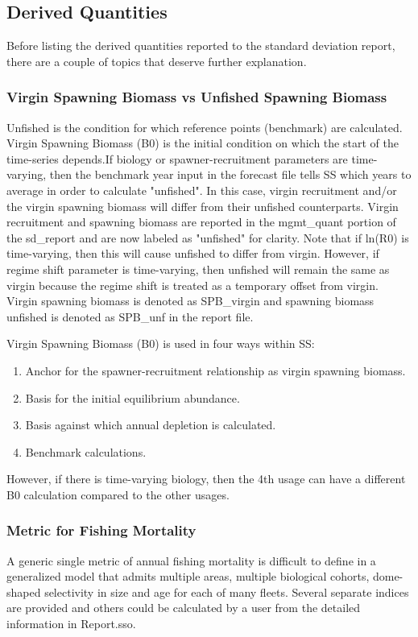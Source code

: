 \subsection{Derived Quantities}
Before listing the derived quantities reported to the standard deviation report, there are a couple of topics that deserve further explanation.

\hypertarget{VirginUnfished}{}
\subsubsection{Virgin Spawning Biomass vs Unfished Spawning Biomass}
Unfished is the condition for which reference points (benchmark) are calculated.  Virgin Spawning Biomass (B0) is the initial condition on which the start of the time-series depends.If biology or spawner-recruitment parameters are time-varying, then the benchmark year input in the forecast file tells SS which years to average in order to calculate "unfished". In this case, virgin recruitment and/or the virgin spawning biomass will differ from their unfished counterparts. Virgin recruitment and spawning biomass are reported in the mgmt\_quant portion of the sd\_report and are now labeled as "unfished" for clarity.  Note that if ln(R0) is time-varying, then this will cause unfished to differ from virgin. However, if regime shift parameter is time-varying, then unfished will remain the same as virgin because the regime shift is treated as a temporary offset from virgin. Virgin spawning biomass is denoted as SPB\_virgin and spawning biomass unfished is denoted as SPB\_unf in the report file.

Virgin Spawning Biomass (B0) is used in four ways within SS:
\begin{enumerate}
	\item Anchor for the spawner-recruitment relationship as virgin spawning biomass.
	\item Basis for the initial equilibrium abundance. 
	\item Basis against which annual depletion is calculated.
	\item Benchmark calculations.
\end{enumerate}
However, if there is time-varying biology, then the 4th usage can have a different B0 calculation compared to the other usages.

\subsubsection{Metric for Fishing Mortality}
A generic single metric of annual fishing mortality is difficult to define in a generalized model that admits multiple areas, multiple biological cohorts, dome-shaped selectivity in size and age for each of many fleets. Several separate indices are provided and others could be calculated by a user from the detailed information in Report.sso.

